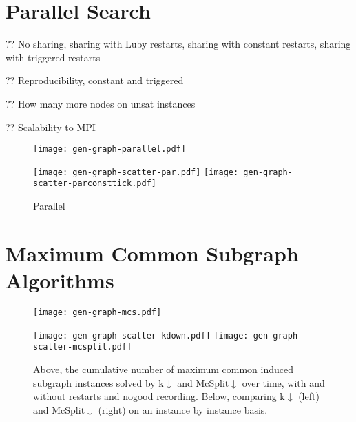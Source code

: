 \documentclass[runningheads]{llncs}
\begin{document}
\section{Parallel Search}

?? No sharing, sharing with Luby restarts, sharing with constant restarts, sharing with triggered
restarts

?? Reproducibility, constant and triggered

?? How many more nodes on unsat instances

?? Scalability to MPI

\begin{figure}[tb]
    \centering
    \texttt{[image: gen-graph-parallel.pdf]}

    \medskip

    \texttt{[image: gen-graph-scatter-par.pdf]}
    \hfill
    \texttt{[image: gen-graph-scatter-parconsttick.pdf]}

    \caption{Parallel}\label{figure:parallel}
\end{figure}

% 
% 


\section{Maximum Common Subgraph Algorithms}

\begin{figure}[tb]
    \centering
    \texttt{[image: gen-graph-mcs.pdf]}

    \medskip

    \texttt{[image: gen-graph-scatter-kdown.pdf]}
    \hfill
    \texttt{[image: gen-graph-scatter-mcsplit.pdf]}

    \caption{Above, the cumulative number of maximum common induced subgraph instances solved by
    k${\downarrow}$ and McSplit${\downarrow}$ over time, with and without restarts and nogood
    recording. Below, comparing k${\downarrow}$ (left) and McSplit${\downarrow}$ (right) on an instance by instance
    basis.}\label{figure:mcs}
\end{figure}
\end{document}
